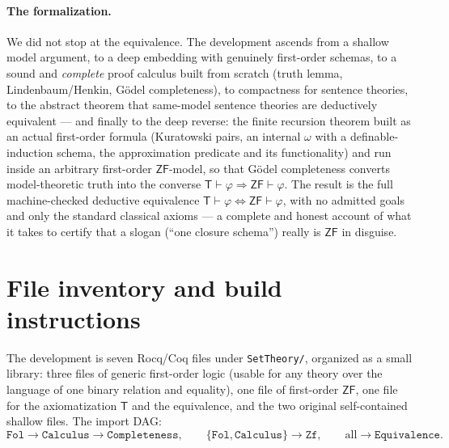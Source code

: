 \documentclass[11pt]{article}
\theoremstyle{plain}
\theoremstyle{definition}
\newcommand{\ZF}{\mathsf{ZF}}
\renewcommand{\ZF}{\textsf{ZF}}
\newcommand{\T}{\textsf{T}}
\newcommand{\proves}{\vdash}
\begin{document}
\paragraph{The formalization.} We did not stop at the equivalence. The development
ascends from a shallow model argument, to a deep embedding with genuinely
first-order schemas, to a sound and \emph{complete} proof calculus built from
scratch (truth lemma, Lindenbaum/Henkin, G\"odel completeness), to compactness for
sentence theories, to the abstract theorem that same-model sentence theories are
deductively equivalent --- and finally to the deep reverse: the finite recursion
theorem built as an actual first-order formula (Kuratowski pairs, an internal
$\omega$ with a definable-induction schema, the approximation predicate and its
functionality) and run inside an arbitrary first-order $\ZF$-model, so that
G\"odel completeness converts model-theoretic truth into the converse
$\T \proves \varphi \Rightarrow \ZF \proves \varphi$. The result is the full
machine-checked deductive equivalence
$\T \proves \varphi \Leftrightarrow \ZF \proves \varphi$, with no admitted goals
and only the standard classical axioms --- a complete and honest account of what
it takes to certify that a slogan (``one closure schema'') really is $\ZF$ in
disguise.

\appendix
\section{File inventory and build instructions}

The development is seven Rocq/Coq files under \texttt{SetTheory/}, organized
as a small library: three files of generic first-order logic (usable for any
theory over the language of one binary relation and equality), one file of
first-order $\ZF$, one file for the axiomatization $\T$ and the equivalence, and
the two original self-contained shallow files. The import DAG:
\[
  \texttt{Fol} \to \texttt{Calculus} \to \texttt{Completeness}, \qquad
  \{\texttt{Fol}, \texttt{Calculus}\} \to \texttt{Zf}, \qquad
  \text{all} \to \texttt{Equivalence}.
\]
\end{document}

